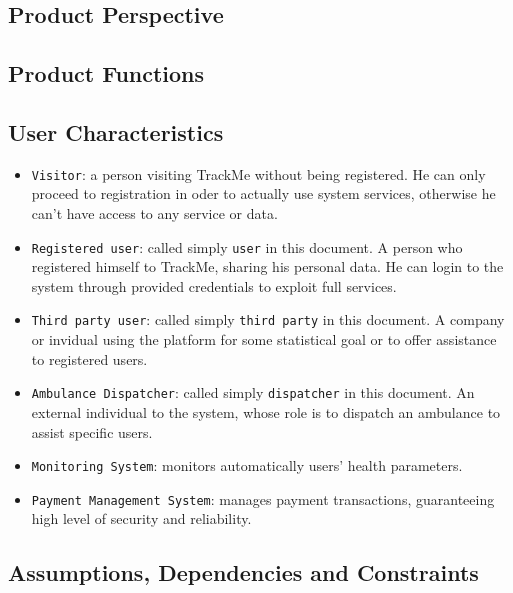 \documentclass[12pt,a4paper]{article}
\begin{document}
		\subsection{Product Perspective}
		
		\subsection{Product Functions}
		
		\subsection{User Characteristics}
			\begin{itemize}
				\item \texttt{Visitor}: a person visiting TrackMe without being registered. He can only proceed to registration in oder to actually use system services, otherwise he can't have access to any service or data.
				\item \texttt{Registered user}: called simply \texttt{user} in this document. A person who registered himself to TrackMe, sharing his personal data. He can login to the system through provided credentials to exploit full services.
				\item \texttt{Third party user}: called simply \texttt{third party} in this document. A company or invidual using the platform for some statistical goal or to offer assistance to registered users.
				\item \texttt{Ambulance Dispatcher}: called simply \texttt{dispatcher} in this document. An external individual to the system, whose role is to dispatch an ambulance to assist specific users.
				\item \texttt{Monitoring System}: monitors automatically users' health parameters.
				\item \texttt{Payment Management System}: manages payment transactions, guaranteeing high level of security and reliability.
			\end{itemize}
		
		\subsection{Assumptions, Dependencies and Constraints}
\end{document}
